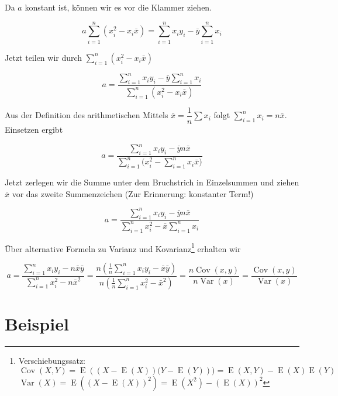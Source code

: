 \documentclass{scrartcl}
\def\sm{\sum\limits_{i=1}^{n}}
\DeclareMathOperator{\cov}{Cov}
\DeclareMathOperator{\var}{Var}
\DeclareMathOperator{\E}{E}
\begin{document}
Da $a$ konstant ist, können wir es vor die Klammer ziehen.

\begin{equation}
a \sm (x_i^2 -x_i\bar{x}) = \sm x_iy_i - \bar{y} \sm x_i 
\end{equation}

Jetzt teilen wir durch $\sm (x_i^2 -x_i\bar{x})$



\begin{equation}
a =  \dfrac{\sm x_iy_i - \bar{y} \sm x_i}{\sm (x_i^2 -x_i\bar{x})} 
\end{equation}

Aus der Definition des arithmetischen Mittels $\bar{x} = \dfrac{1}{n}\sum x_i$ folgt $\sm x_i= n\bar{x}$. Einsetzen ergibt 

\begin{equation}
a =  \dfrac{\sm x_iy_i - \bar{y} n \bar{x}}{ \sm \big( x_i^2 -  \sm x_i \bar{x} \big)}
\end{equation}


Jetzt zerlegen wir die Summe unter dem Bruchstrich in Einzelsummen und ziehen $\bar{x}$ vor das zweite Summenzeichen (Zur Erinnerung: konstanter Term!)

\begin{equation}
a =  \dfrac{\sm x_iy_i - \bar{y} n\bar{x}}{\sm x_i^2 - \bar{x} \sm x_i}
\end{equation}

Über alternative Formeln zu Varianz und Kovarianz\footnote{Verschiebungssatz: \\ $\cov(X,Y) = \E \left((X - \E(X))(Y - \E(Y)\right)) =\E(X,Y)- \E(X)\E(Y)$ \\ $\var(X)=\E\left(\left(X-\E(X)\right)^2\right)=\E(X^2)-\left(\E(X)\right)^2$} erhalten wir

\begin{equation}
a =  \dfrac{\sm x_iy_i - n\bar{x}\bar{y}}{\sm x_i^2 -n\bar{x}^2} = \dfrac{n \left(\frac{1}{n}\sm x_iy_i - \bar{x}\bar{y}\right)}{ n\left( \frac{1}{n}\sm x_i^2 -\bar{x}^2\right)}  = \dfrac{n\cov(x,y)}{n\var(x)} = \dfrac{\cov(x,y)}{\var(x)}
\end{equation}


\section{Beispiel}
\end{document}
